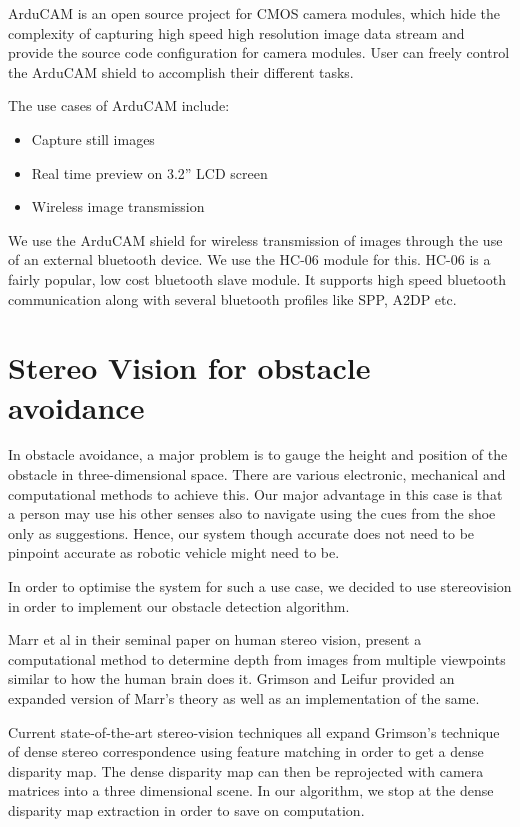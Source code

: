 \documentclass[11pt]{report}
\begin{document}
ArduCAM is an open source project for CMOS camera modules, which hide the complexity of capturing high speed high resolution image data stream and provide the source code configuration for camera modules. User can freely control the ArduCAM shield to accomplish their different tasks.

The use cases of ArduCAM include:

\begin{itemize}
\item Capture still images
\item Real time preview on 3.2” LCD screen
\item Wireless image transmission
\end{itemize}

We use the ArduCAM shield for wireless transmission of images through the use of an external bluetooth device. We use the HC-06 module for this. HC-06 is a fairly popular, low cost bluetooth slave module. It supports high speed bluetooth communication along with several bluetooth profiles like SPP, A2DP etc.

 

\section{Stereo Vision for obstacle avoidance}

In obstacle avoidance, a major problem is to gauge the height and position of the obstacle in three-dimensional space. There are various electronic, mechanical and computational methods to achieve this\cite{slam,infrared, thorpe1988vision}. Our major advantage in this case is that a person may use his other senses also to navigate using the cues from the shoe only as suggestions. Hence, our system though accurate does not need to be pinpoint accurate as robotic vehicle might need to be.

In order to optimise the system for such a use case, we decided to use stereovision\cite{gonzalez,hartley2000multiple} in order to implement our obstacle detection algorithm. 

Marr et al\cite{marr1991computational} in their seminal paper on human stereo vision, present a computational method to determine depth from images from multiple viewpoints similar to how the human brain does it. Grimson and Leifur \cite{grimson1981computer} provided an expanded version of Marr's theory as well as an implementation of the same.

Current state-of-the-art stereo-vision techniques\cite{taxonomy} all expand Grimson's technique of dense stereo correspondence using feature matching in order to get a dense disparity map. The dense disparity map can then be reprojected with camera matrices into a three dimensional scene. In our algorithm, we stop at the dense disparity map extraction in order to save on computation.
\end{document}
